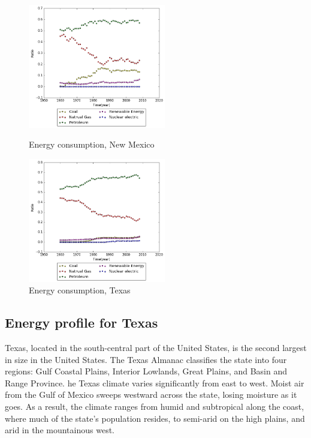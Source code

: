 \documentclass{mcmthesis}
\begin{document}
  \begin{figure}[htbp]
  \centering
  \begin{minipage}[t]{0.48\textwidth}
  \centering
  \includegraphics[width=6cm]{energyprofile_nm.png}
  \caption{Energy consumption, New Mexico}
  \end{minipage}
  \begin{minipage}[t]{0.48\textwidth}
  \centering
  \includegraphics[width=6cm]{energyprofile_tx.png}
  \caption{Energy consumption, Texas}
  \end{minipage}
  \end{figure}
\subsection{Energy profile for Texas}
Texas, located in the south-central part of the United States, is the second largest in size in the United States.
The Texas Almanac classifies the state into four regions: Gulf Coastal Plains, Interior Lowlands, Great Plains, and Basin and Range Province.
he Texas climate varies significantly from east to west. Moist air from the Gulf of Mexico sweeps westward across the state, losing moisture as it goes.
 As a result, the climate ranges from humid and subtropical along the coast, where much of the state's population resides, to semi-arid on the high plains, and arid in the mountainous west.
\end{document}
